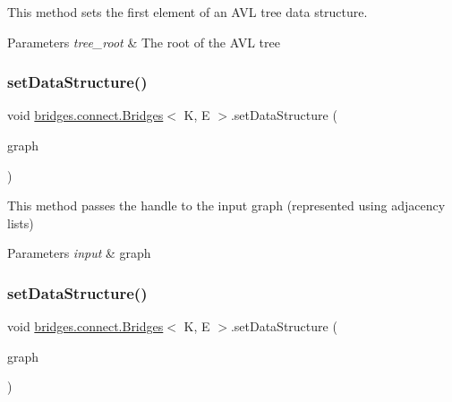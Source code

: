 This method sets the first element of an A\+VL tree data structure.


\begin{DoxyParams}{Parameters}
{\em tree\+\_\+root} & The root of the A\+VL tree \\
\hline
\end{DoxyParams}
\hypertarget{classbridges_1_1connect_1_1_bridges_aa5dc1d094955a486e649fdb05d66502f}{}\label{classbridges_1_1connect_1_1_bridges_aa5dc1d094955a486e649fdb05d66502f} 
\subsubsection{\texorpdfstring{set\+Data\+Structure()}{setDataStructure()}\hspace{0.1cm}{\footnotesize\ttfamily [11/12]}}
{\footnotesize\ttfamily void \hyperlink{classbridges_1_1connect_1_1_bridges}{bridges.\+connect.\+Bridges}$<$ K, E $>$.set\+Data\+Structure (\begin{DoxyParamCaption}\item[{\hyperlink{classbridges_1_1base_1_1_graph_adj_list}{Graph\+Adj\+List}$<$ K, E $>$}]{graph }\end{DoxyParamCaption})}

This method passes the handle to the input graph (represented using adjacency lists)


\begin{DoxyParams}{Parameters}
{\em input} & graph \\
\hline
\end{DoxyParams}
\hypertarget{classbridges_1_1connect_1_1_bridges_a1ac1f8a7c5e95500712c2edaa5e8971f}{}\label{classbridges_1_1connect_1_1_bridges_a1ac1f8a7c5e95500712c2edaa5e8971f} 
\subsubsection{\texorpdfstring{set\+Data\+Structure()}{setDataStructure()}\hspace{0.1cm}{\footnotesize\ttfamily [12/12]}}
{\footnotesize\ttfamily void \hyperlink{classbridges_1_1connect_1_1_bridges}{bridges.\+connect.\+Bridges}$<$ K, E $>$.set\+Data\+Structure (\begin{DoxyParamCaption}\item[{\hyperlink{classbridges_1_1base_1_1_graph_adj_matrix}{Graph\+Adj\+Matrix}$<$ K, E $>$}]{graph }\end{DoxyParamCaption})}

